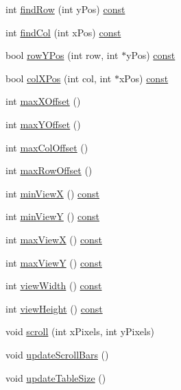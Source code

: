 \begin{DoxyCompactItemize}
\item 
int \hyperlink{classQtTableView_a5627837ee8a2cef014154311c1b08e12}{find\+Row} (int y\+Pos) \hyperlink{tradstdc_8h_a2c212835823e3c54a8ab6d95c652660e}{const} 
\item 
int \hyperlink{classQtTableView_a07a95e1d555144580b3122e9b9e5b021}{find\+Col} (int x\+Pos) \hyperlink{tradstdc_8h_a2c212835823e3c54a8ab6d95c652660e}{const} 
\item 
bool \hyperlink{classQtTableView_a791c1ea1bd59ae7e3f92b8368aecaa41}{row\+Y\+Pos} (int row, int $\ast$y\+Pos) \hyperlink{tradstdc_8h_a2c212835823e3c54a8ab6d95c652660e}{const} 
\item 
bool \hyperlink{classQtTableView_a625ff8a84ece2eae2dd0258a6f66ef87}{col\+X\+Pos} (int col, int $\ast$x\+Pos) \hyperlink{tradstdc_8h_a2c212835823e3c54a8ab6d95c652660e}{const} 
\item 
int \hyperlink{classQtTableView_a9c7c14d087637de47957366b065168c2}{max\+X\+Offset} ()
\item 
int \hyperlink{classQtTableView_aec814d0eb0460dc668127a623e97e58d}{max\+Y\+Offset} ()
\item 
int \hyperlink{classQtTableView_a52b9b1da30a72faf03a5c65de6bbb652}{max\+Col\+Offset} ()
\item 
int \hyperlink{classQtTableView_a241370339faa29d686b42dc7233438af}{max\+Row\+Offset} ()
\item 
int \hyperlink{classQtTableView_a2b6f3b080d4016dd3f6261757a0df17b}{min\+View\+X} () \hyperlink{tradstdc_8h_a2c212835823e3c54a8ab6d95c652660e}{const} 
\item 
int \hyperlink{classQtTableView_a396ab6a40e121e27eaabc3b5938bc95a}{min\+View\+Y} () \hyperlink{tradstdc_8h_a2c212835823e3c54a8ab6d95c652660e}{const} 
\item 
int \hyperlink{classQtTableView_a055d34483e217750bbff0b5cb51c5b35}{max\+View\+X} () \hyperlink{tradstdc_8h_a2c212835823e3c54a8ab6d95c652660e}{const} 
\item 
int \hyperlink{classQtTableView_ad2c8d409ad9df8d9003a8abd1beea096}{max\+View\+Y} () \hyperlink{tradstdc_8h_a2c212835823e3c54a8ab6d95c652660e}{const} 
\item 
int \hyperlink{classQtTableView_a8ea87d39b71cf48c72801b62bca05777}{view\+Width} () \hyperlink{tradstdc_8h_a2c212835823e3c54a8ab6d95c652660e}{const} 
\item 
int \hyperlink{classQtTableView_aa216cc3eabc0df000787dae935c07957}{view\+Height} () \hyperlink{tradstdc_8h_a2c212835823e3c54a8ab6d95c652660e}{const} 
\item 
void \hyperlink{classQtTableView_a51b1af19d7d45b1b420bce831de815a7}{scroll} (int x\+Pixels, int y\+Pixels)
\item 
void \hyperlink{classQtTableView_a52d8d09014adaf7b1d8e487cc7f77e2c}{update\+Scroll\+Bars} ()
\item 
void \hyperlink{classQtTableView_ae095fbe0814392076d256f3bf2936e6d}{update\+Table\+Size} ()
\end{DoxyCompactItemize}

